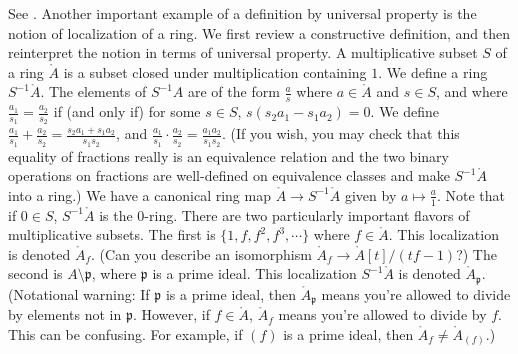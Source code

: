 \begin{remark}
  See \cite[1.3.3.]{vakil2024the-rising-sea}.
  Another important example of a definition by universal property is the notion of localization of a ring. We first review a constructive definition, and then reinterpret the notion in terms of universal property. A multiplicative subset $S$ of a ring $\ring{A}$ is a subset closed under multiplication
  containing $1$. We define a ring $S^{-1}\ring{A}$. The elements of
  $S^{-1}A$ are of the form $\frac{a}{s}$ where $a\in \ring{A}$ and
  $s\in S$, and where $\frac{a_1}{s_1} =\frac{a_2}{s_2}$ if (and only
  if) for some $s\in S$, $s(s_2 a_1  - s_1 a_2) = 0$. We define
  $\frac{a_1}{s_1} + \frac{a_2}{s_2} = \frac{s_2a_1 + s_1a_2}{s_1s_2}$,
  and $\frac{a_1}{s_1} \cdot \frac{a_2}{s_2} =
  \frac{a_1a_2}{s_1s_2}$. (If you wish, you may check that this equality
  of fractions really is an equivalence relation and the two binary
  operations on fractions are well-defined on equivalence classes and
  make $S^{-1}\ring{A}$ into a ring.) We have a canonical ring map $\ring{A}
  \rightarrow S^{-1}\ring{A}$ given by $a\mapsto \frac{a}{1}$. Note that
  if $0\in S$, $S^{-1}\ring{A}$ is the $0$-ring. There are two
  particularly important flavors of multiplicative subsets. The first is
  $\{1, f , f^2 ,f^3 ,\cdots \}$ where $f\in \ring{A}$. This
  localization is denoted $\ring{A}_f$. (Can you describe an isomorphism
  $\ring{A}_f \rightarrow \ring{A}[t]/(tf - 1)$?) The second is $A
  \setminus \mathfrak{p}$, where $\mathfrak{p}$ is a prime ideal. This
  localization $S^{-1}\ring{A}$ is denoted
  $\ring{A}_{\mathfrak{p}}$. (Notational warning: If $\mathfrak{p}$ is a
  prime ideal, then $\ring{A}_{\mathfrak{p}}$ means you’re allowed to
  divide by elements not in $\mathfrak{p}$. However, if $f\in \ring{A}$,
  $\ring{A}_f$ means you’re allowed to divide by $f$. This can be
  confusing. For example, if $(f)$ is a prime ideal, then $\ring{A}_f
  \neq \ring{A}_{(f)}$.)
\end{remark}

